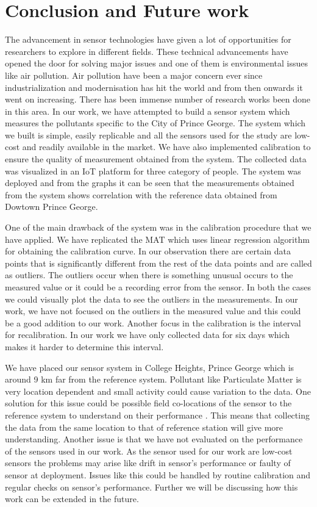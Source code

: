 \chapter{Conclusion and Future work}

The advancement in sensor technologies have given a lot of opportunities for researchers to explore in different fields. These technical advancements have opened the door for solving major issues and one of them is environmental issues like air pollution. Air pollution have been a major concern ever since industrialization and modernisation has hit the world and from then onwards it went on increasing. There has been immense number of research works been done in this area. In our work, we have attempted to build a sensor system which measures the pollutants specific to the City of Prince George. The system which we built is simple, easily replicable and all the sensors used for the study are low-cost and readily available in the market. We have also implemented calibration to ensure the quality of measurement obtained from the system. The collected data was visualized in an IoT platform for three category of people. The system was deployed and from the graphs it can be seen that the measurements obtained from the system shows correlation with the reference data obtained from Dowtown Prince George.


One of the main drawback of the system was in the calibration procedure that we have applied. We have replicated the MAT which uses linear regression algorithm for obtaining the calibration curve. In our observation there are certain data points that is significantly different from the rest of the data points and are called as outliers. The outliers occur when there is something unusual occurs to the measured value or it could be a recording error from the sensor. In both the cases we could visually plot the data to see the outliers in the measurements. In our work, we have not focused on the outliers in the measured value and this could be a good addition to our work. Another focus in the calibration is the interval for recalibration. In our work we have only collected data for six days which makes it harder to determine this interval.

We have placed our sensor system in College Heights, Prince George which is around 9 km far from the reference system. Pollutant like Particulate Matter is very location dependent and small activity could cause variation to the data. One solution for this issue could be possible field co-locations of the sensor to the reference system to understand on their performance \cite{austin2015laboratory}. This means that collecting the data from the same location to that of reference station will give more understanding. Another issue is that we have not evaluated on the performance of the sensors used in our work. As the sensor used for our work are low-cost sensors the problems may arise like drift in sensor's performance or faulty of sensor at deployment. Issues like this could be handled by routine calibration and regular checks on sensor's performance. Further we will be discussing how this work can be extended in the future.





